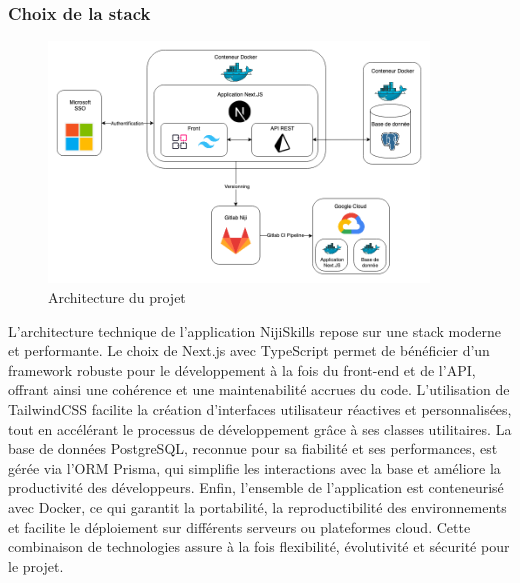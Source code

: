 \documentclass[12pt]{article}
\begin{document}
\subsubsection{Choix de la stack}
\begin{figure}[H]
  \centering
  \includegraphics[width=0.9\textwidth]{img/archi.png}
  \caption{Architecture du projet}
\end{figure}

L’architecture technique de l’application NijiSkills repose sur une stack moderne et performante. Le choix de Next.js avec TypeScript permet de bénéficier d’un framework robuste pour le développement à la fois du front-end et de l’API, offrant ainsi une cohérence et une maintenabilité accrues du code. L’utilisation de TailwindCSS facilite la création d’interfaces utilisateur réactives et personnalisées, tout en accélérant le processus de développement grâce à ses classes utilitaires. La base de données PostgreSQL, reconnue pour sa fiabilité et ses performances, est gérée via l’ORM Prisma, qui simplifie les interactions avec la base et améliore la productivité des développeurs. Enfin, l’ensemble de l’application est conteneurisé avec Docker, ce qui garantit la portabilité, la reproductibilité des environnements et facilite le déploiement sur différents serveurs ou plateformes cloud. Cette combinaison de technologies assure à la fois flexibilité, évolutivité et sécurité pour le projet.
\newpage
\end{document}
